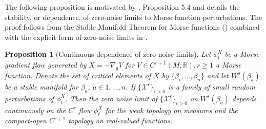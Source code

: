 \documentclass[12pt]{article}
\newtheorem{proposition}[theorem]{Proposition}
\begin{document}
The following proposition is motivated by \cite{bowen1975ergodic}, Proposition 5.4 and details the stability, or dependence, of zero-noise limits to Morse function perturbations. The proof follows from the Stable Manifold Theorem for Morse functions () combined with the explicit form of zero-noise limits in . 

\begin{proposition}
[Continuous dependence of zero-noise limits]
\label{lemma:zero-noise-continuous-dependence}
    Let $\phi^X_t$ be a Morse gradient flow generated by $X = -\nabla_g V$ for $V \in C^{r+1}(M,\mathbb{R}), r\geq1$ a Morse function. Denote the set of critical elements of $X$ by $\{ \beta_i,...,\beta_n\}$ and let $W^s(\beta_a)$ be a stable manifold for $\beta_a$, $a \in 1,...,n$. If $\{\mathcal{X}^{\epsilon}\}_{\epsilon>0}$ is a family of small random perturbations of $\phi_t^X$. Then the zero noise limit of $\{\mathcal{X}^{\epsilon}\}_{\epsilon>0}$ on $W^s(\beta_a)$ depends continuously on the $C^r$ flow $\phi^X_t$ for the weak topology on measures and the compact-open $C^{r+1}$ topology on real-valued functions.
\end{proposition}
\end{document}
